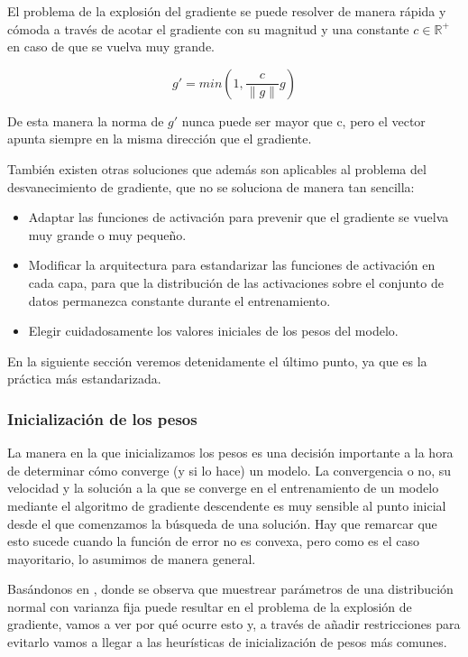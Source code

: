 El problema de la explosión del gradiente se puede resolver de manera rápida y cómoda a través de acotar el gradiente con su magnitud y una constante $c \in \mathbb{R}^+$ en caso de que se vuelva muy grande.

$$g' = min(1, \frac{c}{\|g\|}g)$$

De esta manera la norma de $g'$ nunca puede ser mayor que c, pero el vector apunta siempre en la misma dirección que el gradiente.

También existen otras soluciones que además son aplicables al problema del desvanecimiento de gradiente, que no se soluciona de manera tan sencilla:

\begin{itemize}
    \item Adaptar las funciones de activación para prevenir que el gradiente se vuelva muy grande o muy pequeño.

    \item Modificar la arquitectura para estandarizar las funciones de activación en cada capa, para que la distribución de las activaciones sobre el conjunto de datos permanezca constante durante el entrenamiento.

    \item Elegir cuidadosamente los valores iniciales de los pesos del modelo.
   
\end{itemize}

En la siguiente sección veremos detenidamente el último punto, ya que es la práctica más estandarizada. 


\subsubsection{Inicialización de los pesos}

La manera en la que inicializamos los pesos es una decisión importante a la hora de determinar cómo converge (y si lo hace) un modelo. La convergencia o no, su velocidad y la solución a la que se converge en el entrenamiento de un modelo mediante el algoritmo de gradiente descendente es muy sensible al punto inicial desde el que comenzamos la búsqueda de una solución. Hay que remarcar que esto sucede cuando la función de error no es convexa, pero como es el caso mayoritario, lo asumimos de manera general.  

Basándonos en \cite{stabilityProblem2}, donde se observa que muestrear parámetros de una distribución normal con varianza fija puede resultar en el problema de la explosión de gradiente, vamos a ver por qué ocurre esto y, a través de añadir restricciones para evitarlo vamos a llegar a las heurísticas de inicialización de pesos más comunes.

